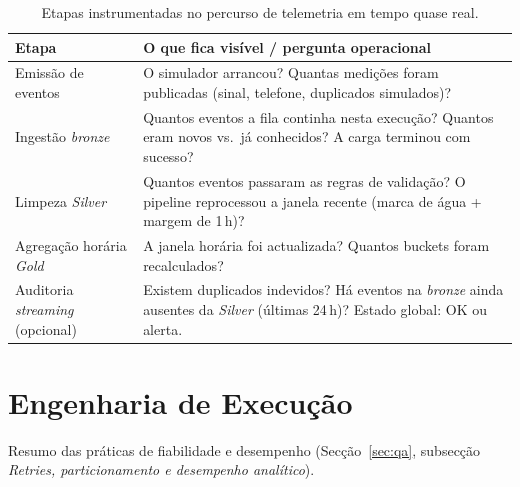 \documentclass[runningheads]{llncs}
\begin{document}
\begin{table}[ht]
\centering
\caption{Etapas instrumentadas no percurso de telemetria em tempo quase real.}
\label{tab:obs-kafka}
\small
\renewcommand{\arraystretch}{1.12}
\begin{tabularx}{\textwidth}{@{}l X@{}}
\toprule
\textbf{Etapa} & \textbf{O que fica visível / pergunta operacional} \\
\midrule
Emissão de eventos &
O simulador arrancou? Quantas medições foram publicadas (sinal, telefone, duplicados simulados)? \\
\addlinespace
Ingestão \textit{bronze} &
Quantos eventos a fila continha nesta execução? Quantos eram novos vs.\ já conhecidos? A carga terminou com sucesso? \\
\addlinespace
Limpeza \textit{Silver} &
Quantos eventos passaram as regras de validação? O pipeline reprocessou a janela recente (marca de água + margem de 1\,h)? \\
\addlinespace
Agregação horária \textit{Gold} &
A janela horária foi actualizada? Quantos buckets foram recalculados? \\
\addlinespace
Auditoria \textit{streaming} (opcional) &
Existem duplicados indevidos? Há eventos na \textit{bronze} ainda ausentes da \textit{Silver} (últimas 24\,h)? Estado global: OK ou alerta. \\
\bottomrule
\end{tabularx}
\end{table}

\clearpage

\section{Engenharia de Execução}
\label{anexo:exec_engineering}

Resumo das práticas de fiabilidade e desempenho (Secção~\ref{sec:qa}, subsecção \textit{Retries, particionamento e desempenho analítico}).
\end{document}
